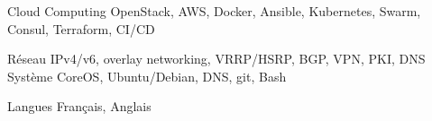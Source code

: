 

\begin{cvskills}

  \cvskill
    {Cloud Computing}
    {OpenStack, AWS, Docker, Ansible, Kubernetes, Swarm, Consul,
    Terraform, CI/CD}

  \cvskill
    {Réseau}
    {IPv4/v6, overlay networking, VRRP/HSRP, BGP, VPN, PKI, DNS}
  \cvskill
    {Système}
    {CoreOS, Ubuntu/Debian, DNS, git, Bash}


  \cvskill
    {Langues} %
    {Français, Anglais} %

\end{cvskills}
